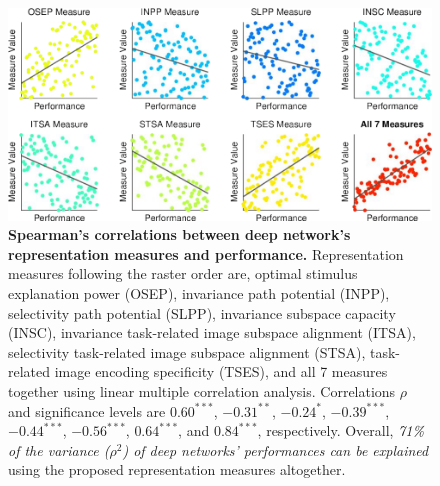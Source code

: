 \documentclass[10pt,twocolumn,letterpaper]{article}
\begin{document}
\begin{figure}
\begin{center}
\includegraphics[width=0.95\columnwidth]{Figs/e_fig7_scatter-crop.pdf} 
\end{center}
\caption{{\bf Spearman's correlations between deep network's representation measures and performance.}
Representation measures following the raster order are, optimal stimulus explanation power (OSEP), invariance path potential (INPP), selectivity path potential (SLPP), invariance subspace capacity (INSC), invariance \vs task-related image subspace alignment (ITSA), selectivity \vs task-related image subspace alignment (STSA), task-related image encoding specificity (TSES), and all 7 measures together using linear multiple correlation analysis.
Correlations $\rho$ and significance levels are $0.60^{\ast\ast\ast}$, $-0.31^{\ast\ast}$, $-0.24^{\ast}$, $-0.39^{\ast\ast\ast}$, $-0.44^{\ast\ast\ast}$, $-0.56^{\ast\ast\ast}$, $0.64^{\ast\ast\ast}$, and $0.84^{\ast\ast\ast}$, respectively.
Overall, \emph{71\% of the variance ($\rho^2$) of deep networks' performances can be explained} using the proposed representation measures altogether.
}
\label{fig:corr}
\end{figure}
\end{document}
